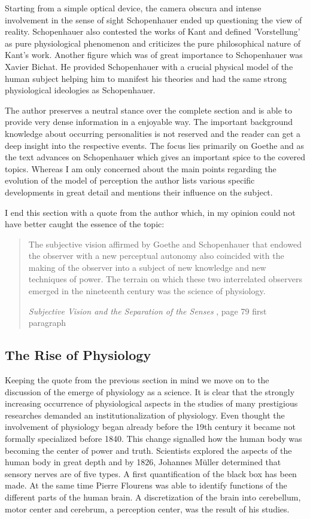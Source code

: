 \documentclass[12pt,a4paper]{article}
\begin{document}
Starting from a simple optical device, the camera obscura and intense involvement in the sense of sight
Schopenhauer ended up questioning the view of reality. Schopenhauer also contested the works of Kant
and defined 'Vorstellung' as pure physiological phenomenon and criticizes the pure philosophical nature
of Kant's work. Another figure which was of great importance to Schopenhauer was Xavier Bichat.
He provided Schopenhauer with a crucial physical model of the human subject helping him to manifest
his theories and had the same strong physiological ideologies as Schopenhauer.

The author preserves a neutral stance over the complete section and is able to provide
very dense information in a enjoyable way. The important background knowledge about occurring
personalities is not reserved and the reader can get a deep insight into the respective events.
The focus lies primarily on Goethe and as the text advances on Schopenhauer which gives an important spice
to the covered topics. Whereas I am only concerned about the main points regarding the evolution of the
model of perception the author lists various specific developments in great detail and mentions their
influence on the subject.

I end this section with a quote from the author which, in my opinion could not have better caught
the essence of the topic:

\begin{quote}

The subjective vision affirmed by Goethe and Schopenhauer that endowed the observer with a new perceptual
autonomy also coincided with the making of the observer into a subject of new knowledge and new
techniques of power. The terrain on which these two interrelated observers emerged in the nineteenth
century was the science of physiology. 

{\it{Subjective Vision and the Separation of the Senses}} \cite{crary}, page 79 first paragraph

\end{quote}

\subsection*{The Rise of Physiology}

Keeping the quote from the previous section in mind we move on to the discussion of the
emerge of physiology as a science.
It is clear that the strongly increasing occurrence of physiological aspects in the studies of many
prestigious researches demanded an institutionalization of physiology. Even thought the involvement
of physiology began already before the 19th century it became not formally specialized before 1840.
This change signalled how the human body was becoming the center of power and truth.
Scientists explored the aspects of the human body in great depth and by 1826, Johannes Müller
determined that sensory nerves are of five types. A first quantification of the black box has been made.
At the same time Pierre Flourens was able to identify functions of the different parts of the human
brain. A discretization of the brain into cerebellum, motor center and cerebrum, a perception center,
was the result of his studies.
\end{document}
